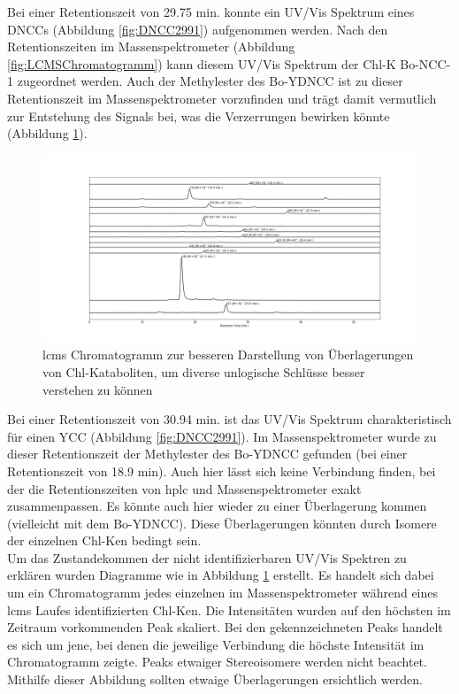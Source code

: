 Bei einer Retentionszeit von 29.75 min. konnte ein UV/Vis Spektrum eines \gls{DNCC}s (Abbildung \ref{fig:DNCC2991}) aufgenommen werden. Nach den Retentionszeiten im Massenspektrometer (Abbildung \ref{fig:LCMSChromatogramm}) kann diesem UV/Vis Spektrum der \gls{Chl-K} Bo-NCC-1 zugeordnet werden. Auch der Methylester des Bo-YDNCC ist zu dieser Retentionszeit im Massenspektrometer vorzufinden und trägt damit vermutlich zur Entstehung des Signals bei, was die Verzerrungen bewirken könnte (Abbildung \ref{fig:LCMSChromatogrammAufspaltung}).

\begin{figure}[!htbp]
  \includegraphics[width=1.4\textwidth, center]{figures/Kapitel6/keineReaktion/Kuerbis_Analyse_keineReaktion2_LC-ESI-MS.png}
  \caption[LC-MS Chromatogramm vor der Reaktion - Aufspaltung der Signale, Quelle: Autor]{\gls{lcms} Chromatogramm zur besseren Darstellung von Überlagerungen von Chl-Kataboliten, um diverse unlogische Schlüsse besser verstehen zu können}
  \label{fig:LCMSChromatogrammAufspaltung}
\end{figure}

Bei einer Retentionszeit von 30.94 min. ist das UV/Vis Spektrum charakteristisch für einen \gls{YCC} (Abbildung \ref{fig:DNCC2991}). Im Massenspektrometer wurde zu dieser Retentionszeit der Methylester des Bo-YDNCC gefunden (bei einer Retentionszeit von 18.9 min). Auch hier lässt sich keine Verbindung finden, bei der die Retentionszeiten von \gls{hplc} und Massenspektrometer exakt zusammenpassen. Es könnte auch hier wieder zu einer Überlagerung kommen (vielleicht mit dem Bo-YDNCC). Diese Überlagerungen könnten durch Isomere der einzelnen \gls{Chl-K}en bedingt sein. \\
 

Um das Zustandekommen der nicht identifizierbaren UV/Vis Spektren zu erklären wurden Diagramme wie in Abbildung \ref{fig:LCMSChromatogrammAufspaltung} erstellt. Es handelt sich dabei um ein Chromatogramm jedes einzelnen im Massenspektrometer während eines \gls{lcms} Laufes identifizierten \gls{Chl-K}en. Die Intensitäten wurden auf den höchsten im Zeitraum vorkommenden Peak skaliert. Bei den gekennzeichneten Peaks handelt es sich um jene, bei denen die jeweilige Verbindung die höchste Intensität im Chromatogramm zeigte. Peaks etwaiger Stereoisomere werden nicht beachtet. Mithilfe dieser Abbildung sollten etwaige Überlagerungen ersichtlich werden. 

